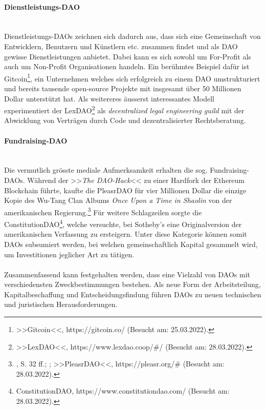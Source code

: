\documentclass[a4paper,12pt]{report}
\begin{document}
        \paragraph{Dienstleistungs-DAO}\hfill \\
        Dienstleistungs-DAOs zeichnen sich dadurch aus, dass sich eine Gemeinschaft von Entwicklern, Benutzern und Künstlern etc. zusammen findet und als DAO gewisse Dienstleistungen anbietet. Dabei kann es sich sowohl um For-Profit als auch um Non-Profit Organisationen handeln. Ein berühmtes Beispiel dafür ist Gitcoin\footnote{\hspace{0.5em}\begin{minipage}[t]{13cm}>>Gitcoin<<, https://gitcoin.co/ (Besucht am: 25.03.2022).\end{minipage}}, ein Unternehmen welches sich erfolgreich zu einem DAO umstrukturiert und bereits tausende open-source Projekte mit insgesamt über 50 Millionen Dollar unterstützt hat. Als weitereres äusserst interessantes Modell experimentiert der LexDAO\footnote{\hspace{0.5em}\begin{minipage}[t]{13cm}>>LexDAO<<, https://www.lexdao.coop/\#/ (Besucht am: 28.03.2022).\end{minipage}} als \textit{decentralized legal engineering guild} mit der Abwicklung von Verträgen durch Code und dezentralisierter Rechtsberatung.
        
        \paragraph{Fundraising-DAO} \hfill \\
        Die vermutlich grösste mediale Aufmerksamkeit erhalten die sog. Fundraising-DAOs. Während der >>\textit{The DAO-Hack}<< zu einer Hardfork der Ethereum Blockchain führte, kaufte die PleasrDAO für vier Millionen Dollar die einzige Kopie des Wu-Tang Clan Albums \textit{Once Upon a Time in Shaolin} von der amerikanischen Regierung.\footnote{\hspace{0.5em}\begin{minipage}[t]{13cm}\citeauthor{MS19}, S. 32 ff.; \citeauthor{NYT}; >>PleasrDAO<<, https://pleasr.org/\# (Besucht am: 28.03.2022).\end{minipage}} Für weitere Schlagzeilen sorgte die ConstitutionDAO\footnote{\hspace{0.5em}\begin{minipage}[t]{13cm}ConstitutionDAO, https://www.constitutiondao.com/ (Besucht am: 28.03.2022).\end{minipage}}, welche versuchte, bei Sotheby’s eine Originalversion der amerikanischen Verfassung zu ersteigern. Unter diese Kategorie können somit  DAOs subsumiert werden, bei welchen gemeinschaftlich Kapital gesammelt wird, um Investitionen jeglicher Art zu tätigen. 
        \\
        \\
        Zusammenfassend kann festgehalten werden, dass eine Vielzahl von DAOs mit verschiedensten Zweckbestimmungen bestehen. Als neue Form der Arbeitsteilung, Kapitalbeschaffung und Entscheidungsfindung führen DAOs zu neuen technischen und juristischen Herausforderungen.
        \closesection
        
\end{document}
